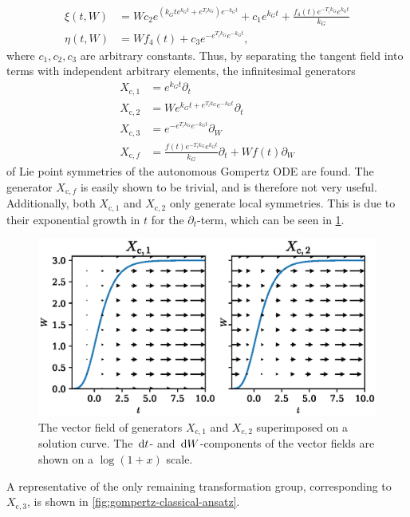 \begin{align*}
  \xi{\left(t,W \right)} &= W c_{2} e^{\left(k_{G} t e^{k_{G} t} + e^{T_{i} k_{G}}\right) e^{- k_{G} t}} + c_{1} e^{k_{G} t} + \frac{f_{4}{\left(t \right)} e^{- T_{i} k_{G}} e^{k_{G} t}}{k_{G}} \\
  \eta{\left(t,W \right)} &= W f_{4}{\left(t \right)} + c_{3} e^{- e^{T_{i} k_{G}} e^{- k_{G} t}},
\end{align*}
where \(c_1, c_2, c_3\) are arbitrary constants.
Thus, by separating the tangent field into terms with independent arbitrary elements, the infinitesimal generators
\begin{align*}
  X_{\text{c},1} &= e^{k_{G} t} \partial_t \\
  X_{\text{c},2} &= W e^{k_{G} t + e^{T_{i} k_{G}} e^{- k_{G} t}} \partial_t \\
  X_{\text{c},3} &= e^{- e^{T_{i} k_{G}} e^{- k_{G} t}} \partial_W \\
  X_{\text{c},f} &= \frac{f{\left(t \right)} e^{- T_{i} k_{G}} e^{k_{G} t}}{k_{G}} \partial_t + W f{\left(t \right)} \partial_W
\end{align*}
of Lie point symmetries of the autonomous Gompertz ODE  are found.
The generator \(X_{\text{c},f}\) is easily shown to be trivial, and is therefore not very useful.
Additionally, both \(X_{\text{c},1}\) and \(X_{\text{c},2}\) only generate local symmetries.
This is due to their exponential growth in \(t\) for the \(\partial_t\)-term, which can be seen in \cref{fig:gompertz-classical-local}.
\begin{figure}
  \centering
  \includegraphics[width=.6517\textwidth]{images/gompertz-classical-local}
  \caption{
    The vector field of generators \(X_{\text{c},1}\) and \(X_{\text{c},2}\) superimposed on a solution curve.
    The \(\dl t\)- and \(\dl W\)-components of the vector fields are shown on a \(\log(1 + x)\) scale.
  }
  \label{fig:gompertz-classical-local}
\end{figure}
A representative of the only remaining transformation group, corresponding to \(X_{\text{c},3}\), is shown in \cref{fig:gompertz-classical-ansatz}.
